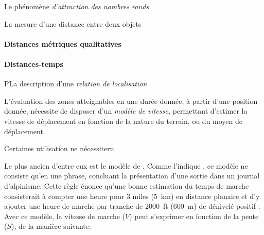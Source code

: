 Le phénomène \emph{d'attraction des nombres ronds}

La mesure d'une distance entre deux objets 



\paragraph{Distances métriques qualitatives}



\paragraph{Distances-temps}




PLa description d'une \emph{relation de localisation}

L'évaluation des zones atteignables en une durée donnée, à partir
d'une position donnée, nécessite de disposer d'un \emph{modèle de
  vitesse,} permettant d'estimer la vitesse de déplacement en fonction
de la nature du terrain, ou du moyen de déplacement.


Certaines utilisation ne nécessitern

Le plus ancien d'entre eux est le modèle de
\textcite{Naismith1892}. Comme l'indique \textcite{Duchene2019}, ce
modèle ne consiste qu'en une phrase, concluant la présentation d'une
sortie dans un journal d'alpinisme. Cette règle énonce qu'une bonne
estimation du temps de marche consisterait à compter une heure pour 3
miles (\SI{5}{\kilo\meter}) en distance planaire et d'y ajouter une
heure de marche par tranche de \SI{2000}{ft} (\SI{600}{\meter}) de
dénivelé positif \autocite{Naismith1892}. Avec ce modèle, la vitesse
de marche (\(V\)) peut s'exprimer en fonction de la pente (\(S\)), de
la manière suivante:

